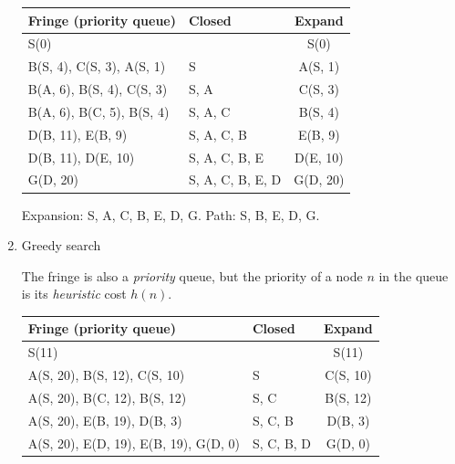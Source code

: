 \documentclass[11pt, a4paper]{article}
\begin{document}
\begin{enumerate}
\begin{solution}
        \begin{table}[h]
            \centering
            \begin{tabular}{l|l|c}
                \toprule
                Fringe (priority queue) & Closed & Expand \\
                \midrule
                S(0) & & S(0) \\
                B(S, 4), C(S, 3), A(S, 1) & S & A(S, 1) \\
                B(A, 6), B(S, 4), C(S, 3) & S, A & C(S, 3) \\
                B(A, 6), B(C, 5), B(S, 4) & S, A, C & B(S, 4) \\
                D(B, 11), E(B, 9) & S, A, C, B & E(B, 9) \\
                D(B, 11), D(E, 10) & S, A, C, B, E & D(E, 10) \\
                G(D, 20) & S, A, C, B, E, D & G(D, 20) \\
                \bottomrule
            \end{tabular}
        \end{table}
        
        Expansion: S, A, C, B, E, D, G. Path: S, B, E, D, G.
    \end{solution}
    
    \item Greedy search
    
    \begin{solution}
        The fringe is also a \emph{priority} queue, but the priority of a node $n$ in the queue is its \emph{heuristic} cost $h(n)$.
    
        \begin{table}[h]
            \centering
            \begin{tabular}{l|l|c}
                \toprule
                Fringe (priority queue) & Closed & Expand \\
                \midrule
                S(11) & & S(11) \\
                A(S, 20), B(S, 12), C(S, 10) & S & C(S, 10) \\
                A(S, 20), B(C, 12), B(S, 12) & S, C & B(S, 12) \\
                A(S, 20), E(B, 19), D(B, 3) & S, C, B & D(B, 3) \\
                A(S, 20), E(D, 19), E(B, 19), G(D, 0) & S, C, B, D & G(D, 0) \\
                \bottomrule
            \end{tabular}
        \end{table}
        

\end{solution}
\end{enumerate}
\end{document}
